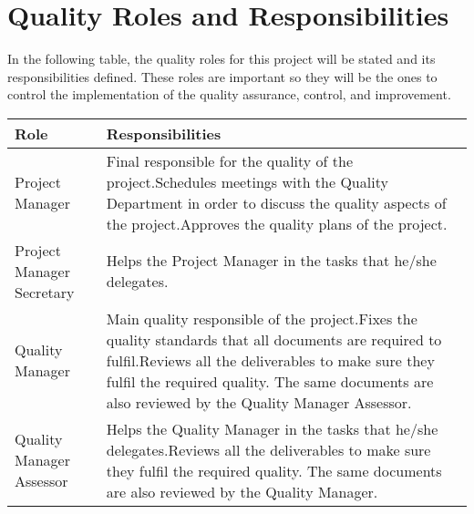 \section{Quality Roles and Responsibilities}

In the following table, the quality roles for this project will be stated and its responsibilities defined. These roles are important so they will be the ones to control the implementation of the quality assurance, control, and improvement.

\begin{longtable}[H]{>{\raggedright\arraybackslash}p{5cm} p{9cm}}
	
	\toprule[2pt]
	
	\textbf{Role} &  \textbf{Responsibilities}\\
	
	\midrule [1.5pt]
	\endhead
	
	Project Manager & Final responsible for the quality of the project.\vspace{0.3cm}\newline Schedules meetings with the Quality Department in order to discuss the quality aspects of the project.\vspace{0.3cm}\newline Approves the quality plans of the project.\vspace{0.2cm} \\
	
	\midrule
		
	Project Manager Secretary & Helps the Project Manager in the tasks that he/she delegates.\vspace{0.2cm} \\
	
	\midrule
	
	Quality Manager & Main quality responsible of the project.\vspace{0.3cm}\newline Fixes the quality standards that all documents are required to fulfil.\vspace{0.3cm}\newline Reviews all the deliverables to make sure they fulfil the required quality. The same documents are also reviewed by the Quality Manager Assessor.\vspace{0.2cm} \\

	\midrule
	
	Quality Manager Assessor & Helps the Quality Manager in the tasks that he/she delegates.\vspace{0.3cm}\newline Reviews all the deliverables to make sure they fulfil the required quality. The same documents are also reviewed by the Quality Manager.\vspace{0.2cm} \\
	

\end{longtable}
